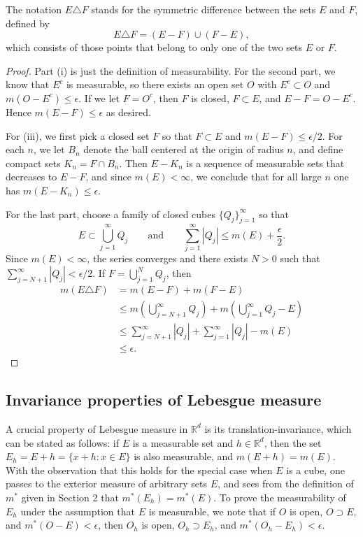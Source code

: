 \documentclass[11pt,openany]{book}
\begin{document}
The notation $E\triangle F$ stands for the symmetric difference between the sets $E$ and $F$, defined by
\[
 E\triangle F=(E-F)\cup(F-E),
\]
which consists of those points that belong to only one of the two sets $E$ or $F$.

\begin{proof}
Part (i) is just the definition of measurability. For the second part, we know that $E^c$ is measurable, so there exists an open set $O$ with $E^c\subset O$ and $m(O-E^c)\le\epsilon$. If we let $F=O^c$, then $F$ is closed, $F\subset E$, and $E-F=O-E^c$. Hence $m(E-F)\le\epsilon$ as desired.

For (iii), we first pick a closed set $F$ so that $F\subset E$ and $m(E-F)\le\epsilon/2$. For each $n$, we let $B_n$ denote the ball centered at the origin of radius $n$, and define compact sets $K_n=F\cap B_n$. Then $E-K_n$ is a sequence of measurable sets that decreases to $E-F$, and since $m(E)<\infty$, we conclude that for all large $n$ one has $m(E-K_n)\le\epsilon$.

For the last part, choose a family of closed cubes $\{Q_j\}_{j=1}^{\infty}$ so that
\[
 E\subset\bigcup_{j=1}^{\infty}Q_j
 \qquad\text{and}\qquad
 \sum_{j=1}^{\infty}|Q_j|\le m(E)+\frac{\epsilon}{2}.
\]
Since $m(E)<\infty$, the series converges and there exists $N>0$ such that $\sum_{j=N+1}^{\infty}|Q_j|<\epsilon/2$. If $F=\bigcup_{j=1}^NQ_j$, then
\[
\begin{aligned}
 m(E\triangle F)
 &=m(E-F)+m(F-E)\\
 &\le m\left(\bigcup_{j=N+1}^{\infty}Q_j\right)
 +m\left(\bigcup_{j=1}^{\infty}Q_j-E\right)\\
 &\le\sum_{j=N+1}^{\infty}|Q_j|
 +\sum_{j=1}^{\infty}|Q_j|-m(E)\\
 &\le\epsilon.
\end{aligned}
\]
\end{proof}

\subsection*{Invariance properties of Lebesgue measure}

A crucial property of Lebesgue measure in $\mathbb{R}^d$ is its translation-invariance, which can be stated as follows: if $E$ is a measurable set and $h\in\mathbb{R}^d$, then the set $E_h=E+h=\{x+h:x\in E\}$ is also measurable, and $m(E+h)=m(E)$. With the observation that this holds for the special case when $E$ is a cube, one passes to the exterior measure of arbitrary sets $E$, and sees from the definition of $m^*$ given in Section 2 that $m^*(E_h)=m^*(E)$. To prove the measurability of $E_h$ under the assumption that $E$ is measurable, we note that if $O$ is open, $O\supset E$, and $m^*(O-E)<\epsilon$, then $O_h$ is open, $O_h\supset E_h$, and $m^*(O_h-E_h)<\epsilon$.
\end{document}
